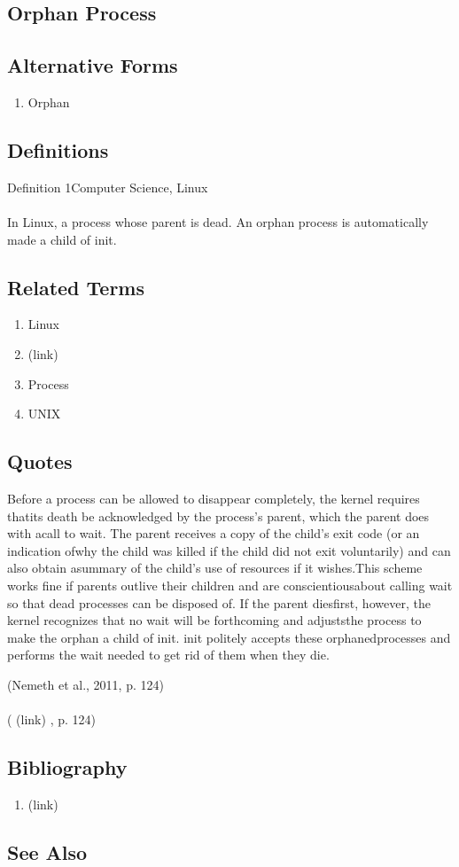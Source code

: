 \newpage \subsection*{Orphan Process } \subsection*{Alternative Forms } \begin{enumerate} \item  Orphan  \end{enumerate} \subsection*{Definitions } \begin{DIC_Def}{Definition 1Computer Science, Linux }{} \paragraph{} In Linux, a process whose parent is dead. An orphan process is automatically made a child of init.  \end{DIC_Def} \subsection*{Related Terms } \begin{enumerate} \item  Linux  \item  (link) \href{Orphan (Dictionary Entry) }{ }   \item  Process  \item  UNIX  \end{enumerate} \subsection*{Quotes } \begin{DIC_BlockQuote} Before a process can be allowed to disappear completely, the kernel requires thatits death be acknowledged by the process's parent, which the parent does with acall to wait. The parent receives a copy of the child's exit code (or an indication ofwhy the child was killed if the child did not exit voluntarily) and can also obtain asummary of the child's use of resources if it wishes.This scheme works fine if parents outlive their children and are conscientiousabout calling wait so that dead processes can be disposed of. If the parent diesfirst, however, the kernel recognizes that no wait will be forthcoming and adjuststhe process to make the orphan a child of init. init politely accepts these orphanedprocesses and performs the wait needed to get rid of them when they die.  \end{DIC_BlockQuote} (Nemeth et al., 2011, p. 124)  \paragraph{} (  (link) \href{Nemeth et al., 2011 }{ } , p. 124)  \subsection*{Bibliography } \begin{enumerate} \item  (link) \href{Nemeth et al., 2011 }{ }   \end{enumerate} \subsection*{See Also } 